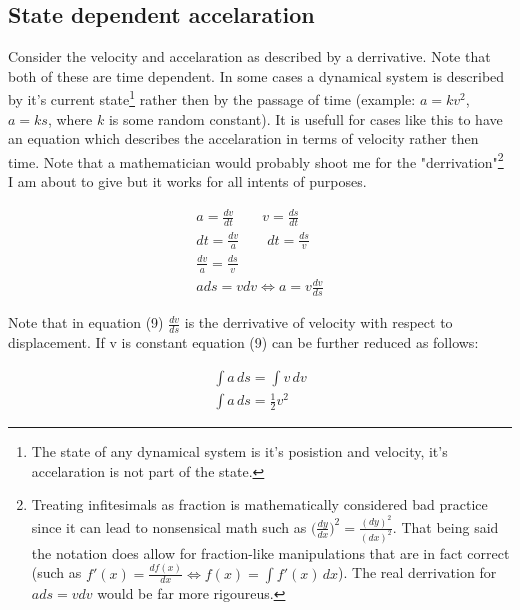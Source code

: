 \documentclass[11pt, a4paper]{article}
\begin{document}
\subsection{State dependent accelaration}
Consider the velocity and accelaration as described by a derrivative. Note that both
of these are time dependent. In some cases a dynamical system is described by it's current state\footnote{The state
of any dynamical system is it's posistion and velocity, it's accelaration is not part of the state.}
rather then by the passage of time (example: $a=kv^2$, $a = ks$, where $k$ is some random constant). It is usefull 
for cases like this to have an equation which describes the accelaration in terms of velocity rather then time. 
Note that a mathematician would probably shoot me for the "derrivation"\footnote{Treating infitesimals as fraction is mathematically considered
bad practice since it can lead to nonsensical math such as $\Big(\frac{dy}{dx}\Big)^2 = \frac{(dy)^2}{(dx)^2}$. That being said the notation does allow for
fraction-like manipulations that are in fact correct (such as $f'(x) = \frac{df(x)}{dx} \Leftrightarrow f(x) = \int f'(x)\,dx$). The real derrivation for
$ads = vdv$ would be far more rigoureus.} 
I am about to give but it works for all intents of purposes.

\begin{gather}
    a = \frac{dv}{dt} \qquad v = \frac{ds}{dt} \\
    dt = \frac{dv}{a} \qquad dt = \frac{ds}{v} \\
    \frac{dv}{a} = \frac{ds}{v}\\
    ads = vdv \Leftrightarrow a = v\frac{dv}{ds}
\end{gather}

Note that in equation (9) $\frac{dv}{ds}$ is the derrivative of velocity with respect to displacement.
If v is constant equation (9) can be further reduced as follows:

\begin{gather}
    \int a\,ds = \int v \, dv \\
    \int a\,ds = \frac{1}{2}v^2
\end{gather}
\end{document}
